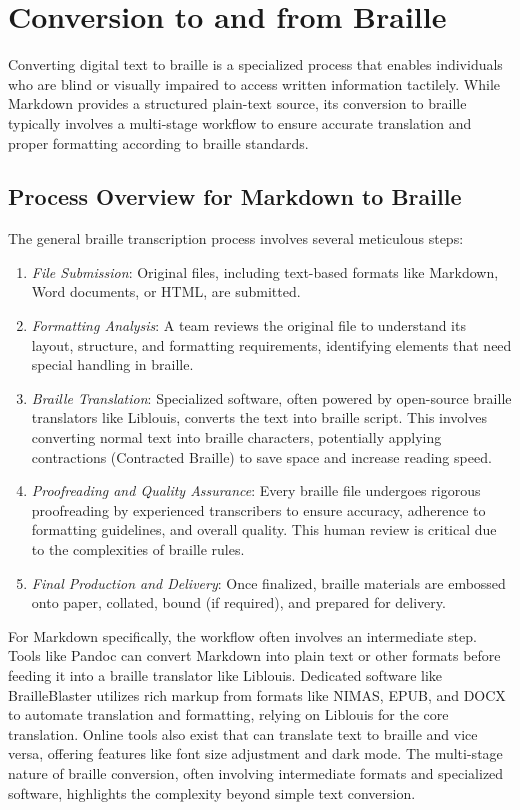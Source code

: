 \section{Conversion to and from Braille}
\label{sec:markdown-braille}

Converting digital text to braille is a specialized process that enables individuals who are blind or visually impaired to access written information tactilely. While Markdown provides a structured plain-text source, its conversion to braille typically involves a multi-stage workflow to ensure accurate translation and proper formatting according to braille standards.

\subsection{Process Overview for Markdown to Braille}
The general braille transcription process involves several meticulous steps:
\begin{enumerate}
    \item \emph{File Submission}: Original files, including text-based formats like Markdown, Word documents, or HTML, are submitted. \cite{BrailleProcess}
    \item \emph{Formatting Analysis}: A team reviews the original file to understand its layout, structure, and formatting requirements, identifying elements that need special handling in braille. \cite{BrailleProcess}
    \item \emph{Braille Translation}: Specialized software, often powered by open-source braille translators like Liblouis, converts the text into braille script. \cite{Liblouis, DAISYPipeline, BrailleBlaster} This involves converting normal text into braille characters, potentially applying contractions (Contracted Braille) to save space and increase reading speed. \cite{InclusiveASL, TextToBraille}
    \item \emph{Proofreading and Quality Assurance}: Every braille file undergoes rigorous proofreading by experienced transcribers to ensure accuracy, adherence to formatting guidelines, and overall quality. \cite{BrailleProcess} This human review is critical due to the complexities of braille rules.
    \item \emph{Final Production and Delivery}: Once finalized, braille materials are embossed onto paper, collated, bound (if required), and prepared for delivery. \cite{BrailleProcess, YouTubeBraille}
\end{enumerate}
For Markdown specifically, the workflow often involves an intermediate step. Tools like Pandoc can convert Markdown into plain text or other formats before feeding it into a braille translator like Liblouis. \cite{Liblouis} Dedicated software like BrailleBlaster utilizes rich markup from formats like NIMAS, EPUB, and DOCX to automate translation and formatting, relying on Liblouis for the core translation. \cite{BrailleBlaster} Online tools also exist that can translate text to braille and vice versa, offering features like font size adjustment and dark mode. \cite{BrailleTranslatorGH} The multi-stage nature of braille conversion, often involving intermediate formats and specialized software, highlights the complexity beyond simple text conversion.

